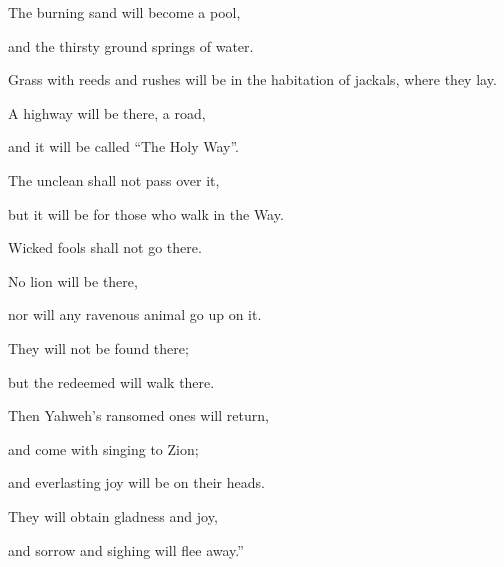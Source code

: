 {\par }{\Q {}The burning sand will become a pool,
\par }{\QB and the thirsty ground springs of water.
\par }{\QB Grass with reeds and rushes will be in the habitation of jackals, where they lay.
\par }{\Q {}A highway will be there, a road,
\par }{\QB and it will be called “The Holy Way”.
\par }{\Q The unclean shall not pass over it,
\par }{\QB but it will be for those who walk in the Way.
\par }{\QB Wicked fools shall not go there.
\par }{\Q {}No lion will be there,
\par }{\QB nor will any ravenous animal go up on it.
\par }{\QB They will not be found there;
\par }{\QB but the redeemed will walk there.
\par }{\Q {}Then Yahweh’s ransomed ones will return,
\par }{\QB and come with singing to Zion;
\par }{\QB and everlasting joy will be on their heads.
\par }{\Q They will obtain gladness and joy,
\par }{\QB and sorrow and sighing will flee away.”

}
